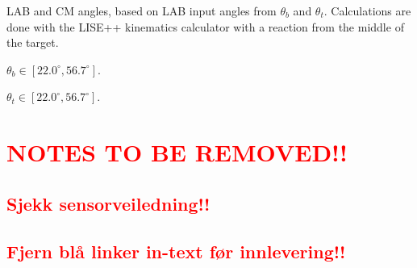 \documentclass[twoside,english]{uiofysmaster/uiofysmaster}
\begin{document}
\begin{table}[htb] 
    \centering 
    \caption{LAB and CM angles, based on LAB input angles from $\theta_b$ and $\theta_t$. 
    Calculations are done with the LISE++ \cite{LISE} kinematics calculator with a reaction from the middle of the target.}
	\label{tab:LABvsCM}
    \begin{subtable}{0.45\textwidth}
    		\centering
		\caption{$\theta_b \in [22.0^\circ, 56.7^\circ]$.}
	 	\label{tab:LABvsCM_b}
	 	
	\end{subtable}
	\begin{subtable}{0.45\textwidth}
		\centering
		\caption{$\theta_t \in [22.0^\circ, 56.7^\circ]$.}
		\label{tab:LABvsCM_t}
		
	\end{subtable}
\end{table}







\newpage

\chapter*{\textcolor{red}{NOTES TO BE REMOVED!!}}

\section*{\textcolor{red}{Sjekk sensorveiledning!!}}

\section*{\textcolor{red}{Fjern blå linker in-text før innlevering!!}}
\end{document}
